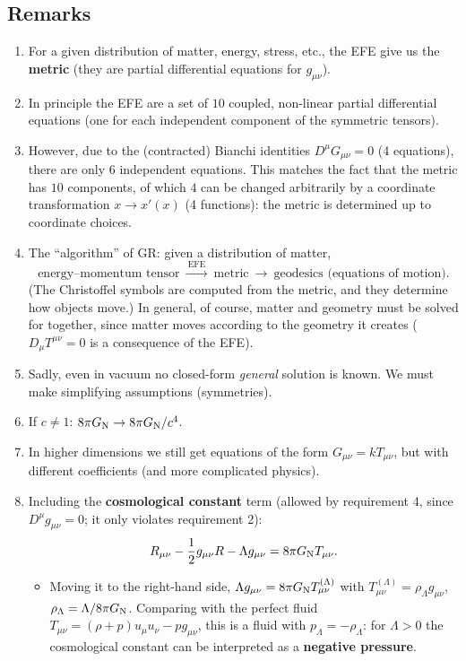 \subsection{Remarks}
\begin{enumerate}[label=(\roman*)]
\item For a given distribution of matter, energy, stress, etc., the EFE give us the \textbf{metric} (they are partial differential equations for $g_{\mu\nu}$).
\item In principle the EFE are a set of $10$ coupled, non-linear partial differential equations (one for each independent component of the symmetric tensors).
\item However, due to the (contracted) Bianchi identities $D^\mu G_{\mu\nu}=0$ (4 equations), there are only $6$ independent equations. This matches the fact that the metric has $10$ components, of which $4$ can be changed arbitrarily by a coordinate transformation $x\to x'(x)$ (4 functions): the metric is determined up to coordinate choices.
\item The ``algorithm'' of GR: given a distribution of matter,
\[
  \text{energy--momentum tensor}\ \xrightarrow{\ \text{EFE}\ }\ \text{metric}\ \longrightarrow\ \text{geodesics (equations of motion)}.
\]
(The Christoffel symbols are computed from the metric, and they determine how objects move.) In general, of course, matter and geometry must be solved for together, since matter moves according to the geometry it creates ($D_\mu T^{\mu\nu}=0$ is a consequence of the EFE).
\item Sadly, even in vacuum no closed-form \emph{general} solution is known. We must make simplifying assumptions (symmetries).
\item If $c\neq1$: $8\pi G_{\mathrm N}\to8\pi G_{\mathrm N}/c^4$.
\item In higher dimensions we still get equations of the form $G_{\mu\nu}=kT_{\mu\nu}$, but with different coefficients (and more complicated physics).
\item Including the \textbf{cosmological constant} term (allowed by requirement 4, since $D^\mu g_{\mu\nu}=0$; it only violates requirement 2):
\begin{equation}
  R_{\mu\nu}-\frac12g_{\mu\nu}R-\Lambda g_{\mu\nu}=8\pi G_{\mathrm N} T_{\mu\nu}.
\end{equation}
\begin{itemize}[nosep]
\item Moving it to the right-hand side, $\Lambda g_{\mu\nu}=8\pi G_{\mathrm N} T^{(\Lambda)}_{\mu\nu}$ with $T^{(\Lambda)}_{\mu\nu}=\rho_\Lambda g_{\mu\nu}$, $\rho_\Lambda=\Lambda/8\pi G_{\mathrm N}$. Comparing with the perfect fluid $T_{\mu\nu}=(\rho+p)u_\mu u_\nu-pg_{\mu\nu}$, this is a fluid with $p_\Lambda=-\rho_\Lambda$: for $\Lambda>0$ the cosmological constant can be interpreted as a \textbf{negative pressure}.

\end{itemize}
\end{enumerate}

